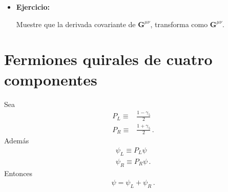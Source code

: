 \begin{itemize}
\item \textbf{Ejercicio:}

Muestre que la derivada covariante de $\mathbf{G}^{\mu\nu}$, transforma como $\mathbf{G}^{\mu\nu}$.
\end{itemize}


\section{Fermiones quirales de cuatro componentes}
\label{sec:ferm-quir-de}

Sea
\begin{align}
  P_L\equiv&\frac{1-\gamma_5}{2}\nonumber\\
  P_R\equiv&\frac{1+\gamma_5}{2}\,.
\end{align}
Además
\begin{align}
  \psi_L\equiv P_L\psi\nonumber\\
  \psi_R\equiv P_R\psi\,.
\end{align}
Entonces
\begin{align}
  \psi=\psi_L+\psi_R\,.
\end{align}

